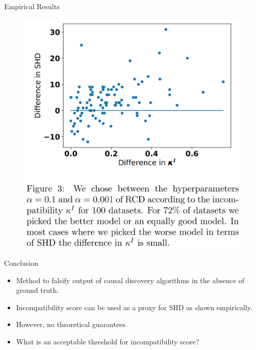 \documentclass{beamer}
\begin{document}
\begin{frame}{Empirical Results}
	\begin{figure}
		\includegraphics[scale=0.12]{imgs/empirical2.png}
	\end{figure}
\end{frame}

\begin{frame}{Conclusion}
	\begin{itemize}
		\item Method to falsify output of causal discovery algorithms in the absence of ground truth.
		\item Incompatibility score can be used as a proxy for SHD as shown empirically.
		\item However, no theoretical guarantees.
		\item What is an acceptable threshold for incompatibility score?
	\end{itemize}
\end{frame}
\end{document}
